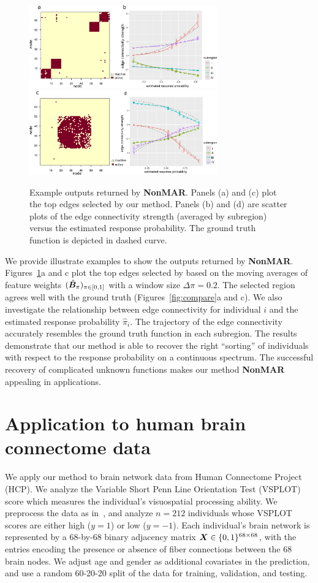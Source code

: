 \documentclass[11pt]{article}
\theoremstyle{plain}
\theoremstyle{definition}
\def\NonparaM{\text{\bf \small NonMAR }}
\begin{document}
\begin{figure}[ht]
    \centering
   \includegraphics[width=8.1cm]{est_block.pdf}
          \includegraphics[width=8.1cm]{est_circle.pdf}
 \caption{Example outputs returned by {\bf \small NonMAR}. Panels (a) and (c) plot the top edges selected by our method. Panels (b) and (d) are scatter plots of the edge connectivity strength (averaged by subregion) versus the estimated response probability. The ground truth function is depicted in dashed curve.}\label{fig:compare2}
\end{figure}


We provide illustrate examples to show the outputs returned by {\bf \small NonMAR}. Figures~\ref{fig:compare2}a and c plot the top edges selected by \NonparaM based on the moving averages of feature weights $(\hat {\bm B}_\pi)_{\pi\in[0,1]}$ with a window size $\Delta \pi = 0.2$. The selected region agrees well with the ground truth (Figures~\ref{fig:compare}a and c). We also investigate the relationship between edge connectivity for individual $i$ and the estimated response probability $\hat \pi_i$. The trajectory of the edge connectivity accurately resembles the ground truth function in each subregion. The results demonstrate that our method is able to recover the right ``sorting'' of individuals with respect to the response probability on a continuous spectrum. 
The successful recovery of complicated unknown functions makes our method {\bf \small NonMAR} appealing in applications. 

\section{Application to human brain connectome data}\label{sec:real}

We apply our method to brain network data from Human Connectome Project (HCP). We analyze the Variable Short Penn Line Orientation Test (VSPLOT) score which measures the individual's visuospatial processing ability. We preprocess the data as in~\cite{wang2019common}, and analyze $n=212$ individuals whose VSPLOT scores are either high ($y=1$) or low ($y=-1$). Each individual's brain network is represented by a 68-by-68 binary adjacency matrix $\bm X\in\{0,1\}^{68\times 68}$, with the entries encoding the presence or absence of fiber connections between the 68 brain nodes. We adjust age and gender as additional covariates in the prediction, and use a random 60-20-20 split of the data for training, validation, and testing. 
\end{document}
